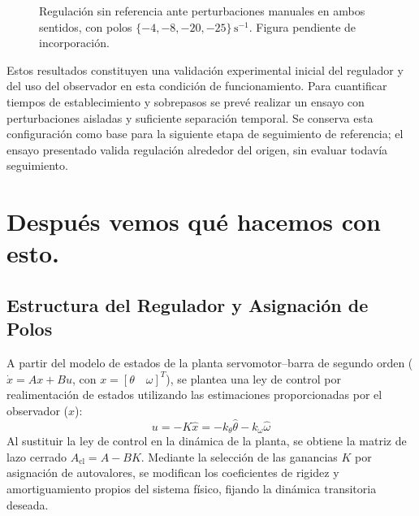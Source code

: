 \documentclass[a4paper, twoside, 10pt, spanish]{article}
\numberwithin{table}{section}
\begin{document}
\begin{figure}[htbp]
    \centering
    \caption{Regulación sin referencia ante perturbaciones manuales en ambos sentidos, con polos $\{-4,-8,-20,-25\}\,\mathrm{s}^{-1}$. Figura pendiente de incorporación.}
    \label{fig:regulacion-sin-referencia-ensayo02}
\end{figure}

Estos resultados constituyen una validación experimental inicial del regulador y del uso del observador en esta condición de funcionamiento. Para cuantificar tiempos de establecimiento y sobrepasos se prevé realizar un ensayo con perturbaciones aisladas y suficiente separación temporal. Se conserva esta configuración como base para la siguiente etapa de seguimiento de referencia; el ensayo presentado valida regulación alrededor del origen, sin evaluar todavía seguimiento.

\section{Después vemos qué hacemos con esto.}

\subsection{Estructura del Regulador y Asignación de Polos}
A partir del modelo de estados de la planta servomotor--barra de segundo orden ($\dot{x} = A x + B u$, con $x = [\theta \quad \omega]^T$), se plantea una ley de control por realimentación de estados utilizando las estimaciones proporcionadas por el observador ($\hat{x}$):
\begin{equation}
u = -K \hat{x} = -k_\theta \hat{\theta} - k_\omega \hat{\omega}
\end{equation}
Al sustituir la ley de control en la dinámica de la planta, se obtiene la matriz de lazo cerrado $A_{\text{cl}} = A - B K$. Mediante la selección de las ganancias $K$ por asignación de autovalores, se modifican los coeficientes de rigidez y amortiguamiento propios del sistema físico, fijando la dinámica transitoria deseada.
\end{document}
